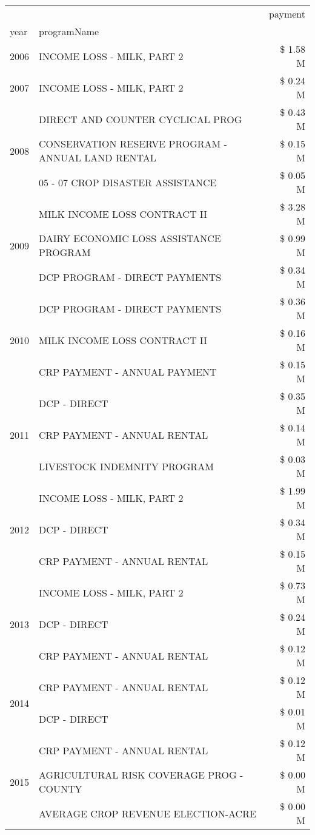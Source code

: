 \begin{tabular}{llr}
\toprule
 &  & payment \\
year & programName &  \\
\midrule
2006 & INCOME LOSS - MILK, PART 2 & \$ 1.58 M \\
\cline{1-3}
2007 & INCOME LOSS - MILK, PART 2 & \$ 0.24 M \\
\cline{1-3}
\multirow[t]{3}{*}{2008} & DIRECT AND COUNTER CYCLICAL PROG & \$ 0.43 M \\
 & CONSERVATION RESERVE PROGRAM - ANNUAL LAND RENTAL & \$ 0.15 M \\
 & 05 - 07 CROP DISASTER ASSISTANCE & \$ 0.05 M \\
\cline{1-3}
\multirow[t]{3}{*}{2009} & MILK INCOME LOSS CONTRACT II & \$ 3.28 M \\
 & DAIRY ECONOMIC LOSS ASSISTANCE PROGRAM & \$ 0.99 M \\
 & DCP PROGRAM - DIRECT PAYMENTS & \$ 0.34 M \\
\cline{1-3}
\multirow[t]{3}{*}{2010} & DCP PROGRAM - DIRECT PAYMENTS & \$ 0.36 M \\
 & MILK INCOME LOSS CONTRACT II & \$ 0.16 M \\
 & CRP PAYMENT - ANNUAL PAYMENT & \$ 0.15 M \\
\cline{1-3}
\multirow[t]{3}{*}{2011} & DCP - DIRECT & \$ 0.35 M \\
 & CRP PAYMENT - ANNUAL RENTAL & \$ 0.14 M \\
 & LIVESTOCK INDEMNITY PROGRAM & \$ 0.03 M \\
\cline{1-3}
\multirow[t]{3}{*}{2012} & INCOME LOSS - MILK, PART 2 & \$ 1.99 M \\
 & DCP - DIRECT & \$ 0.34 M \\
 & CRP PAYMENT - ANNUAL RENTAL & \$ 0.15 M \\
\cline{1-3}
\multirow[t]{3}{*}{2013} & INCOME LOSS - MILK, PART 2 & \$ 0.73 M \\
 & DCP - DIRECT & \$ 0.24 M \\
 & CRP PAYMENT - ANNUAL RENTAL & \$ 0.12 M \\
\cline{1-3}
\multirow[t]{2}{*}{2014} & CRP PAYMENT - ANNUAL RENTAL & \$ 0.12 M \\
 & DCP - DIRECT & \$ 0.01 M \\
\cline{1-3}
\multirow[t]{3}{*}{2015} & CRP PAYMENT - ANNUAL RENTAL & \$ 0.12 M \\
 & AGRICULTURAL RISK COVERAGE PROG - COUNTY & \$ 0.00 M \\
 & AVERAGE CROP REVENUE ELECTION-ACRE & \$ 0.00 M \\

\end{tabular}
